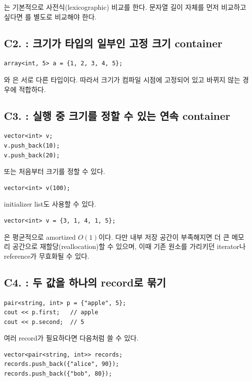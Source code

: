 \begin{notebox}[문자열 비교]
는 기본적으로 사전식(lexicographic) 비교를 한다. 문자열 길이 자체를 먼저 비교하고 싶다면 를 별도로 비교해야 한다.
\end{notebox}

\subsection{C2. : 크기가 타입의 일부인 고정 크기 container}
\begin{lstlisting}
array<int, 5> a = {1, 2, 3, 4, 5};
\end{lstlisting}

와 은 서로 다른 타입이다. 따라서 크기가 컴파일 시점에 고정되어 있고 바뀌지 않는 경우에 적합하다.

\subsection{C3. : 실행 중 크기를 정할 수 있는 연속 container}
\begin{lstlisting}
vector<int> v;
v.push_back(10);
v.push_back(20);
\end{lstlisting}

또는 처음부터 크기를 정할 수 있다.
\begin{lstlisting}
vector<int> v(100);
\end{lstlisting}

initializer list도 사용할 수 있다.
\begin{lstlisting}
vector<int> v = {3, 1, 4, 1, 5};
\end{lstlisting}

은 평균적으로 amortized $O(1)$이다. 다만 내부 저장 공간이 부족해지면 더 큰 메모리 공간으로 재할당(reallocation)할 수 있으며, 이때 기존 원소를 가리키던 iterator나 reference가 무효화될 수 있다.

\subsection{C4. : 두 값을 하나의 record로 묶기}
\begin{lstlisting}
pair<string, int> p = {"apple", 5};
cout << p.first;   // apple
cout << p.second;  // 5
\end{lstlisting}

여러 record가 필요하다면 다음처럼 쓸 수 있다.
\begin{lstlisting}
vector<pair<string, int>> records;
records.push_back({"alice", 90});
records.push_back({"bob", 80});
\end{lstlisting}

